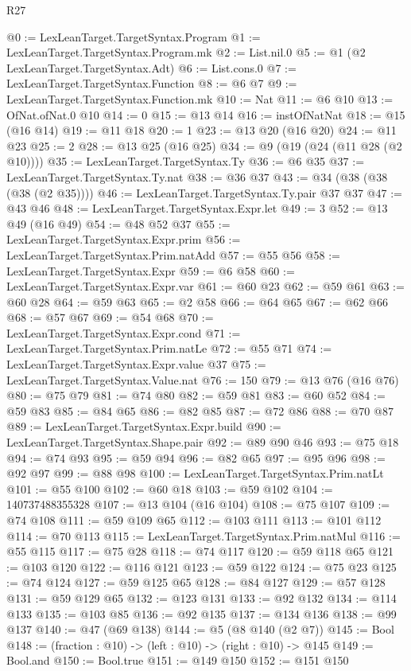 \begin{lexlean}{R27}
\begin{coremodule}
@0 := LexLeanTarget.TargetSyntax.Program
@1 := LexLeanTarget.TargetSyntax.Program.mk
@2 := List.nil.{0}
@5 := @1 (@2 LexLeanTarget.TargetSyntax.Adt)
@6 := List.cons.{0}
@7 := LexLeanTarget.TargetSyntax.Function
@8 := @6 @7
@9 := LexLeanTarget.TargetSyntax.Function.mk
@10 := Nat
@11 := @6 @10
@13 := OfNat.ofNat.{0} @10
@14 := 0
@15 := @13 @14
@16 := instOfNatNat
@18 := @15 (@16 @14)
@19 := @11 @18
@20 := 1
@23 := @13 @20 (@16 @20)
@24 := @11 @23
@25 := 2
@28 := @13 @25 (@16 @25)
@34 := @9 (@19 (@24 (@11 @28 (@2 @10))))
@35 := LexLeanTarget.TargetSyntax.Ty
@36 := @6 @35
@37 := LexLeanTarget.TargetSyntax.Ty.nat
@38 := @36 @37
@43 := @34 (@38 (@38 (@38 (@2 @35))))
@46 := LexLeanTarget.TargetSyntax.Ty.pair @37 @37
@47 := @43 @46
@48 := LexLeanTarget.TargetSyntax.Expr.let
@49 := 3
@52 := @13 @49 (@16 @49)
@54 := @48 @52 @37
@55 := LexLeanTarget.TargetSyntax.Expr.prim
@56 := LexLeanTarget.TargetSyntax.Prim.natAdd
@57 := @55 @56
@58 := LexLeanTarget.TargetSyntax.Expr
@59 := @6 @58
@60 := LexLeanTarget.TargetSyntax.Expr.var
@61 := @60 @23
@62 := @59 @61
@63 := @60 @28
@64 := @59 @63
@65 := @2 @58
@66 := @64 @65
@67 := @62 @66
@68 := @57 @67
@69 := @54 @68
@70 := LexLeanTarget.TargetSyntax.Expr.cond
@71 := LexLeanTarget.TargetSyntax.Prim.natLe
@72 := @55 @71
@74 := LexLeanTarget.TargetSyntax.Expr.value @37
@75 := LexLeanTarget.TargetSyntax.Value.nat
@76 := 150
@79 := @13 @76 (@16 @76)
@80 := @75 @79
@81 := @74 @80
@82 := @59 @81
@83 := @60 @52
@84 := @59 @83
@85 := @84 @65
@86 := @82 @85
@87 := @72 @86
@88 := @70 @87
@89 := LexLeanTarget.TargetSyntax.Expr.build
@90 := LexLeanTarget.TargetSyntax.Shape.pair
@92 := @89 @90 @46
@93 := @75 @18
@94 := @74 @93
@95 := @59 @94
@96 := @82 @65
@97 := @95 @96
@98 := @92 @97
@99 := @88 @98
@100 := LexLeanTarget.TargetSyntax.Prim.natLt
@101 := @55 @100
@102 := @60 @18
@103 := @59 @102
@104 := 140737488355328
@107 := @13 @104 (@16 @104)
@108 := @75 @107
@109 := @74 @108
@111 := @59 @109 @65
@112 := @103 @111
@113 := @101 @112
@114 := @70 @113
@115 := LexLeanTarget.TargetSyntax.Prim.natMul
@116 := @55 @115
@117 := @75 @28
@118 := @74 @117
@120 := @59 @118 @65
@121 := @103 @120
@122 := @116 @121
@123 := @59 @122
@124 := @75 @23
@125 := @74 @124
@127 := @59 @125 @65
@128 := @84 @127
@129 := @57 @128
@131 := @59 @129 @65
@132 := @123 @131
@133 := @92 @132
@134 := @114 @133
@135 := @103 @85
@136 := @92 @135
@137 := @134 @136
@138 := @99 @137
@140 := @47 (@69 @138)
@144 := @5 (@8 @140 (@2 @7))
@145 := Bool
@148 := (fraction : @10) -> (left : @10) -> (right : @10) -> @145
@149 := Bool.and
@150 := Bool.true
@151 := @149 @150
@152 := @151 @150

\end{coremodule}
\end{lexlean}
